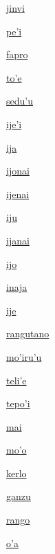 {\hyperlink{val:jinvi}{jinvi}}{}{}{}

{\hyperlink{val:pehi}{pe'i}}{}{}{}

{\hyperlink{val:fapro}{fapro}}{}{}{}

{\hyperlink{val:tohe}{to'e}}{}{}{}

{\hyperlink{val:seduhu}{sedu'u}}{}{}{}

{\hyperlink{val:ijehi}{ije'i}}{}{}{}

{\hyperlink{val:ija}{ija}}{}{}{}

{\hyperlink{val:ijonai}{ijonai}}{}{}{}

{\hyperlink{val:ijenai}{ijenai}}{}{}{}

{\hyperlink{val:iju}{iju}}{}{}{}

{\hyperlink{val:ijanai}{ijanai}}{}{}{}

{\hyperlink{val:ijo}{ijo}}{}{}{}

{\hyperlink{val:inaja}{inaja}}{}{}{}

{\hyperlink{val:ije}{ije}}{}{}{}

{\hyperlink{val:rangutano}{rangutano}}{}{}{}

{\hyperlink{val:mohiruhu}{mo'iru'u}}{}{}{}

{\hyperlink{val:telihe}{teli'e}}{}{}{}

{\hyperlink{val:tepohi}{tepo'i}}{}{}{}

{\hyperlink{val:mai}{mai}}{}{}{}

{\hyperlink{val:moho}{mo'o}}{}{}{}

{\hyperlink{val:kerlo}{kerlo}}{}{}{}

{\hyperlink{val:ganzu}{ganzu}}{}{}{}

{\hyperlink{val:rango}{rango}}{}{}{}

{\hyperlink{val:oha}{o'a}}{}{}{}

